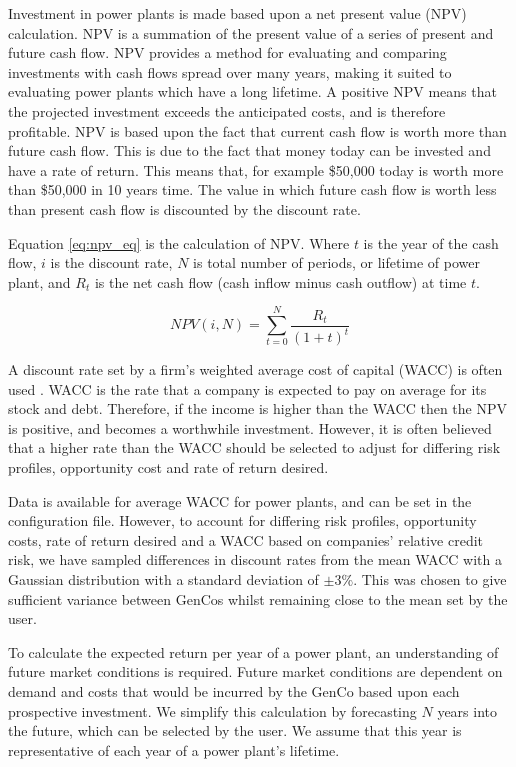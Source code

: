 Investment in power plants is made based upon a net present value (NPV) calculation. NPV is a summation of the present value of a series of present and future cash flow. NPV provides a method for evaluating and comparing investments with cash flows spread over many years, making it suited to evaluating power plants which have a long lifetime. A positive NPV means that the projected investment exceeds the anticipated costs, and is therefore profitable. NPV is based upon the fact that current cash flow is worth more than future cash flow. This is due to the fact that money today can be invested and have a rate of return. This means that, for example \$50,000 today is worth more than \$50,000 in 10 years time. The value in which future cash flow is worth less than present cash flow is discounted by the discount rate.

Equation \ref{eq:npv_eq} is the calculation of NPV. Where $t$ is the year of the cash flow, $i$ is the discount rate, $N$ is total number of periods, or lifetime of power plant, and $R_t$ is the net cash flow (cash inflow minus cash outflow) at time $t$.

\begin{equation} \label{eq:npv_eq}
NPV(i, N) = \sum_{t=0}^{N}\frac{R_t}{(1+t)^t}
\end{equation}

A discount rate set by a firm's weighted average cost of capital (WACC) is often used \cite{KincheloeStephenC1990TWAC}. WACC is the rate that a company is expected to pay on average for its stock and debt. Therefore, if the income is higher than the WACC then the NPV is positive, and becomes a worthwhile investment. However, it is often believed that a higher rate than the WACC should be selected to adjust for differing risk profiles, opportunity cost and rate of return desired.

Data is available for average WACC for power plants, and can be set in the configuration file. However, to account for differing risk profiles, opportunity costs, rate of return desired and a WACC based on companies' relative credit risk, we have sampled differences in discount rates from the mean WACC with a Gaussian distribution with a standard deviation of $\pm3\%$. This was chosen to give sufficient variance between GenCos whilst remaining close to the mean set by the user.

To calculate the expected return per year of a power plant, an understanding of future market conditions is required. Future market conditions are dependent on demand and costs that would be incurred by the GenCo based upon each prospective investment. We simplify this calculation by forecasting $N$ years into the future, which can be selected by the user. We assume that this year is representative of each year of a power plant's lifetime.


